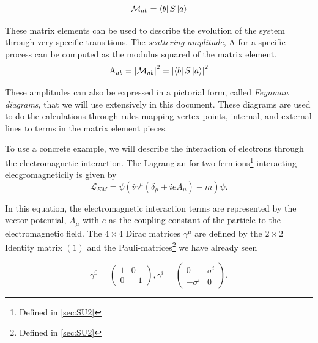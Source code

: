 \begin{equation}
\label{eq:bSa}
\mathcal{M}_{ab} = \bra{b}S\ket{a}
\end{equation}

These matrix elements can be used to describe the evolution of the system through very specific transitions. The \textit{scattering amplitude}, $\mathrm{A}$ for a specific process can be computed as the modulus squared of the matrix element.
\begin{equation}
\label{eq:Amplitude}
\mathrm{A}_{ab} = \left|\mathcal{M}_{ab}\right|^{2} = \left|\bra{b}S\ket{a}\right|^{2}
\end{equation}

These amplitudes can also be expressed in a pictorial form, called \textit{Feynman diagrams}, that we will use extensively in this document. These diagrams are used to do the calculations through rules mapping vertex points, internal, and external lines to terms in the matrix element pieces.
  


To use a concrete example, we will describe the interaction of electrons through the electromagnetic interaction. The Lagrangian for two fermions\footnote{Defined in \ref{sec:SU2}} interacting elecgromagneticily is given by 
\begin{equation}
\label{eq:EMlagrangian}
\mathcal{L}_{EM} = \bar{\psi} \left(i\gamma^{\mu}\left(\delta_{\mu} + ieA_{\mu}\right) - m\right)\psi.
\end{equation}

In this equation, the electromagnetic interaction terms are represented by the vector potential, $A_{\mu}$ with $e$ as the coupling constant of the particle to the electromagnetic field. The $4 \times 4$ Dirac matrices $\gamma^{\mu}$ are defined by the $2 \times 2$ Identity matrix $\left(1\right)$ and the Pauli-matrices\footnote{Defined in \ref{sec:SU2}} we have already seen

\begin{equation}
\label{eq:GammaMatrix}
\gamma^{0} = \begin{pmatrix} 1 & 0 \\
					       0 & -1 \end{pmatrix},
\gamma^{i} = \begin{pmatrix} 0 & \sigma^{i} \\
                                               -\sigma^{i} & 0 \end{pmatrix}.
\end{equation}

